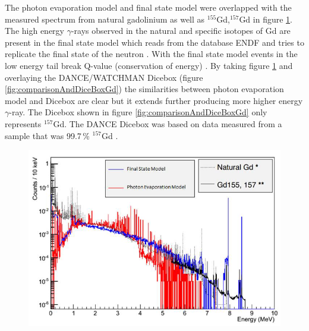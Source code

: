 The photon evaporation model and final state model were overlapped with the measured spectrum from natural gadolinium as well as $^{155}$Gd,$^{157}$Gd in figure \ref{fig:comparisonGd}. The high energy $\gamma$-rays observed in the natural and specific isotopes of Gd are present in the final state model which reads from the database ENDF \cite{BROWN20181} and tries to replicate the final state of the neutron \cite{koiTatsumi_2006}. With the final state model events in the low energy tail break Q-value (conservation of energy) \cite{YuChen_2015}. By taking figure \ref{fig:comparisonGd} and overlaying the DANCE/WATCHMAN Dicebox (figure \ref{fig:comparisonAndDiceBoxGd}) the similarities between photon evaporation model and Dicebox are clear but it extends further producing more higher energy $\gamma$-ray. The Dicebox shown in figure \ref{fig:comparisonAndDiceBoxGd} only represents $^{157}$Gd. The DANCE Dicebox was based on data measured from a sample that was  99.7\,\% $^{157}$Gd \cite{Chyzh_2011}. 

\begin{figure}[!h]
 \centering
 \includegraphics[width=0.7\linewidth]{Chapter4/Figs/Raster/gadolinium/comparisonGd.png}
 \label{fig:comparisonGd}
\end{figure}

